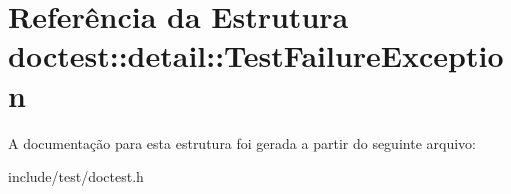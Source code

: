 \hypertarget{structdoctest_1_1detail_1_1TestFailureException}{}\section{Referência da Estrutura doctest\+:\+:detail\+:\+:Test\+Failure\+Exception}
\label{structdoctest_1_1detail_1_1TestFailureException}


A documentação para esta estrutura foi gerada a partir do seguinte arquivo\+:\begin{DoxyCompactItemize}
\item 
include/test/doctest.\+h\end{DoxyCompactItemize}
